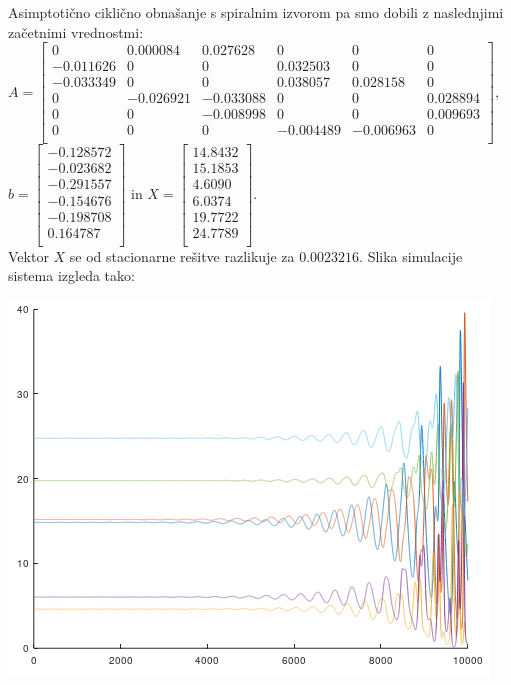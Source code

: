 \documentclass[a4paper, 12pt]{article}
\begin{document}
Asimptotično ciklično obnašanje s spiralnim izvorom pa smo dobili z naslednjimi
začetnimi vrednostmi:\\
$ A =
\begin{bmatrix}
	0 & 0.000084 & 0.027628 & 0 & 0 & 0 \\
	-0.011626 & 0 & 0 & 0.032503 & 0 & 0 \\
	-0.033349 & 0 & 0 & 0.038057 & 0.028158 & 0 \\
	0 & -0.026921 & -0.033088 & 0 & 0 & 0.028894 \\
	0 & 0 & -0.008998 & 0 & 0 & 0.009693 \\
	0 & 0 & 0 & -0.004489 & -0.006963 & 0 \\
\end{bmatrix} $, \\
$ b =
\begin{bmatrix}
	-0.128572 \\
	-0.023682 \\
	-0.291557 \\
	-0.154676 \\
	-0.198708 \\
	0.164787 \\
\end{bmatrix} $ in
$ X =
\begin{bmatrix}
	14.8432 \\
	15.1853 \\
	4.6090 \\
	6.0374 \\
	19.7722 \\
	24.7789 \\
\end{bmatrix} $. \\
Vektor $ X $ se od stacionarne rešitve razlikuje za $ 0.0023216 $. Slika simulacije
sistema izgleda tako:
\begin{center}
	\includegraphics{asimptotic_cyclic_source.png}
\end{center}
\end{document}

